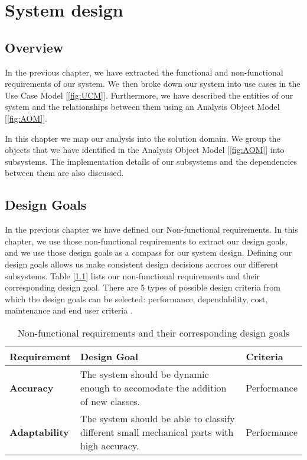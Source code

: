 \chapter{System design}

\section{Overview}

In the previous chapter, we have extracted the functional and non-functional requirements of our system. We then broke down our system into use cases in the Use Case Model [\ref{fig:UCM}]. Furthermore, we have described the entities of our system and the relationships between them using an Analysis Object Model [\ref{fig:AOM}].

In this chapter we map our analysis into the solution domain. We group the objects that we have identified in the Analysis Object Model [\ref{fig:AOM}] into subsystems. The implementation details of our subsystems and the dependencies between them are also discussed.

\section{Design Goals}

In the previous chapter we have defined our Non-functional requirements. In this chapter, we use those non-functional requirements to extract our design goals, and we use those design goals as a compass for our system design. Defining our design goals allows us make consistent design decisions accross our different subsystems. Table [\ref{tab:DG}] lists our non-functional requirements and their corresponding design goal. There are 5 types of possible design criteria from which the design goals can be selected: performance, dependability, cost, maintenance and end user criteria \cite{bruegge2004object}.

\begin{table}
  \centering
  \begin{tabular}{ | l | p{5cm} | l | }
    \hline
    \textbf{Requirement} & \textbf{Design Goal} & \textbf{Criteria} \\ \hline
    \textbf{Accuracy} & The system should be dynamic enough to accomodate the addition of new classes. & Performance \\ \hline
    \textbf{Adaptability} & The system should be able to classify different small mechanical parts with high accuracy. & Performance \\ \hline
  \end{tabular}
  \caption{Non-functional requirements and their corresponding design goals}
  \label{tab:DG}
\end{table}

